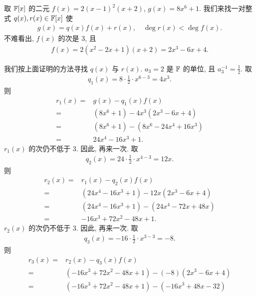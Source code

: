 \begin{example}
    取 $\mathbb{F}[x]$ 的二元 $f(x) = 2(x-1)^2 (x+2)$, $g(x) = 8x^6 + 1$. 我们来找一对整式 $q(x), r(x) \in \mathbb{F}[x]$ 使
    \begin{align*}
        g(x) = q(x) f(x) + r(x), \quad \deg r(x) < \deg f(x).
    \end{align*}
    不难看出, $f(x)$ 的次是 3, 且
    \begin{align*}
        f(x) = 2(x^2 - 2x + 1)(x+2) = 2x^3 - 6x + 4.
    \end{align*}

    我们按上面证明的方法寻找 $q(x)$ 与 $r(x)$. $a_3 = 2$ 是 $\mathbb{F}$ 的单位, 且 $a_3^{-1} = \frac12$. 取
    \begin{align*}
        q_1 (x) = 8\cdot \frac12 \cdot x^{6-3} = 4x^3.
    \end{align*}
    则
    \begin{align*}
        r_1 (x)
        = {} & g(x) - q_1(x) f(x)                  \\
        = {} & (8x^6 + 1) - 4x^3 (2x^3 - 6x + 4)   \\
        = {} & (8x^6 + 1) - (8x^6 - 24x^4 + 16x^3) \\
        = {} & 24x^4 - 16x^3 + 1.
    \end{align*}
    $r_1 (x)$ 的次仍不低于 $3$. 因此, 再来一次. 取
    \begin{align*}
        q_2 (x) = 24 \cdot \frac12 \cdot x^{4-3} = 12x.
    \end{align*}
    则
    \begin{align*}
        r_2 (x)
        = {} & r_1 (x) - q_2(x) f(x)                     \\
        = {} & (24x^4 - 16x^3 + 1) - 12x (2x^3 - 6x + 4) \\
        = {} & (24x^4 - 16x^3 + 1) - (24x^4 - 72x + 48x) \\
        = {} & -16x^3 + 72x^2 - 48x + 1.
    \end{align*}
    $r_2 (x)$ 的次仍不低于 $3$. 因此, 再来一次. 取
    \begin{align*}
        q_3 (x) = -16 \cdot \frac12 \cdot x^{3-3} = -8.
    \end{align*}
    则
    \begin{align*}
        r_3 (x)
        = {} & r_2 (x) - q_3(x) f(x)                             \\
        = {} & (-16x^3 + 72x^2 - 48x + 1) - (-8) (2x^3 - 6x + 4) \\
        = {} & (-16x^3 + 72x^2 - 48x + 1) - (-16x^3 + 48x - 32)  \\

\end{align*}
\end{example}

